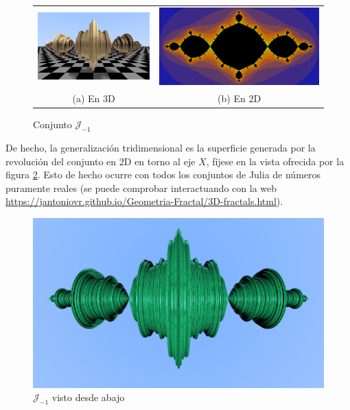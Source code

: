 \begin{figure}[ht]
    \centering
    \begin{tabular}{cc}
        \includegraphics[scale=0.37]{img/C8/julia-3D-frontal-1.png} &
      \includegraphics[scale=0.31]{img/C8/julia-2D-1.png} \\    
    (a) En 3D & (b) En 2D  \\
    \end{tabular}
    \caption{Conjunto $\mathcal{J}_{-1}$}
    \label{fig:julia-3D-2D}
\end{figure}

De hecho, la generalización tridimensional es la superficie generada por la revolución del conjunto en 2D en torno al eje $X$, fíjese en la vista ofrecida por la figura \ref{fig:julia-3D-abajo-1}. Esto de hecho ocurre con todos los conjuntos de Julia de números puramente reales (se puede comprobar interactuando con la web \url{https://jantoniovr.github.io/Geometria-Fractal/3D-fractals.html}).

\begin{figure} [ht]
    \centering
    \includegraphics[scale = 0.5]{img/C8/julia-3D-abajo-1.png}
    \caption{$\mathcal{J}_{-1}$ visto desde abajo}
    \label{fig:julia-3D-abajo-1}
\end{figure}

